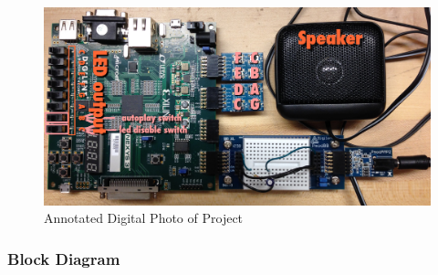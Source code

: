 \documentclass{article}
\begin{document}
      \begin{figure}[H]
        \centering
        \includegraphics[width=6.5in]{img/annotated.jpg}
        \caption{Annotated Digital Photo of Project}
      \end{figure}

    \subsubsection{Block Diagram}

\end{document}

